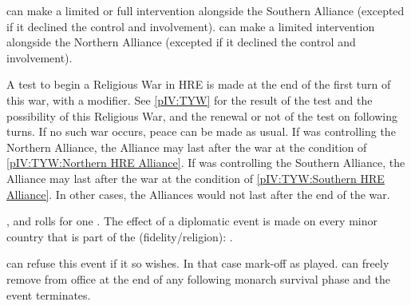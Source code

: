 \phdipl
\aparag \SPA can make a limited or full intervention alongside the Southern
Alliance (excepted if it declined the control and involvement).
\aparag \SUE can make a limited intervention alongside the Northern Alliance
(excepted if it declined the control and involvement).

\phpaix
\aparag A test to begin a Religious War in HRE is made at the end of the first
turn of this war, with a  modifier.  See \ref{pIV:TYW} for the
result of the test and the possibility of this Religious War, and the renewal
or not of the test on following turns.  If no such war occurs, peace can be
made as usual.
\bparag If \HOL was controlling the Northern Alliance, the Alliance may last
after the war at the condition of \ref{pIV:TYW:Northern HRE Alliance}.
\bparag If \MAJHAB was controlling the Southern Alliance, the Alliance may
last after the war at the condition of \ref{pIV:TYW:Southern HRE Alliance}.
\bparag In other cases, the Alliances would not last after the end of the war.




\phevnt
\aparag \AUS, \HOL and \SPA rolls for one \REVOLT .
\aparag The effect of a diplomatic event is made on every minor country that
is part of the \HRE (fidelity/religion):
.





\condition{}
\aparag \SPA can refuse this event if it so wishes. In that case mark-off as
played.
\aparag \SPA can freely remove  from office at the end of
any following monarch survival phase and the event terminates.

